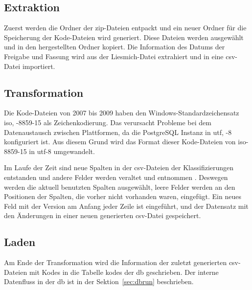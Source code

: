 \subsection{Extraktion} \label{subsec:extraction}

Zuerst werden die Ordner der \ac{zip}-Dateien entpackt und ein neuer Ordner für die Speicherung der Kode-Dateien wird generiert. Diese Dateien werden ausgewählt und in den hergestellten Ordner kopiert. Die Information des Datums der Freigabe und Fassung wird aus der Liesmich-Datei extrahiert und in eine \ac{csv}-Datei importiert.


\subsection{Transformation} \label{subsec:transf}

Die Kode-Dateien von 2007 bis 2009 haben den Windows-Standardzeichensatz \acl{iso}, -8859-15 als Zeichenkodierung. Das verursacht Probleme bei dem Datenaustausch zwischen Plattformen, da die PostgreSQL Instanz in \acl{utf}, -8 konfiguriert ist. Aus diesem Grund wird das Format dieser Kode-Dateien von \ac{iso}-8859-15 in \ac{utf}-8 umgewandelt.

Im Laufe der Zeit sind neue Spalten in der \ac{csv}-Dateien der Klassifizierungen entstanden und andere Felder werden veraltet und entnommen \cite{readme13, readme17}. Deswegen werden die aktuell benutzten Spalten ausgewählt, leere Felder werden an den Positionen der Spalten, die vorher nicht vorhanden waren, eingefügt. Ein neues Feld mit der Version am Anfang jeder Zeile ist eingeführt, und der Datensatz mit den Änderungen in einer neuen generierten \ac{csv}-Datei gespeichert.


\subsection{Laden} \label{subsec:load}

Am Ende der Transformation wird die Information der zuletzt generierten \ac{csv}-Dateien mit Kodes in die Tabelle \glqq\textsf{kodes}\grqq{} der \ac{db} geschrieben. Der interne Datenfluss in der \ac{db} ist in der Sektion~\ref{sec:dbrun} beschrieben.